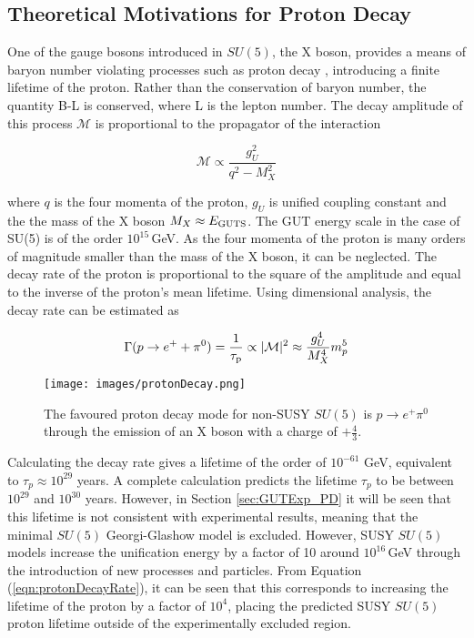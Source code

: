 \documentclass{article}
\begin{document}
\subsection{Theoretical Motivations for Proton Decay}
\label{sec:GUTPDTh}
One of the gauge bosons introduced in $SU(5)$, the X boson, provides a means of baryon number violating processes such as proton decay \cite{SU5ProtonDecay}, introducing a finite lifetime of the proton. Rather than the conservation of baryon number, the quantity B-L is conserved, where L is the lepton number. The decay amplitude of this process $\mathcal{M}$ is proportional to the propagator of the interaction 

\begin{equation}
\label{eqn:protonDecayAmplitude}
    \mathcal{M} \propto \frac{g^2 _U}{q^2 - M^2 _X}
\end{equation}

where $q$ is the four momenta of the proton, $g_U$ is unified coupling constant and the the mass of the X boson $M_X\approx E_{\rm{GUTS}}$. The GUT energy scale in the case of SU(5) is of the order $10^{15}\,$GeV. As the four momenta of the proton is many orders of magnitude smaller than the mass of the X boson, it can be neglected. The decay rate of the proton is proportional to the square of the amplitude and equal to the inverse of the proton's mean lifetime. Using dimensional analysis, the decay rate can be estimated as

\begin{equation}
\label{eqn:protonDecayRate}
    \Gamma(p\rightarrow e^+ + \pi^0)=\frac{1}{\tau_{\rm{p}}}\propto|\mathcal{M}|^2 \approx \frac{g^4 _U}{M^4 _X}m^5 _p
\end{equation}

\begin{figure}
    \centering
    \label{fig:protonDecay}
    \texttt{[image: images/protonDecay.png]}
    \caption{The favoured proton decay mode for non-SUSY $SU(5)$ is $p\rightarrow e^+\pi^0$ through the emission of an X boson with a charge of $+\frac{4}{3}$.}
\end{figure}

Calculating the decay rate gives a lifetime of the order of $10^{-61}$ GeV, equivalent to $\tau_p \approx 10^{29}$ years. A complete calculation predicts the lifetime $\tau_p$ to be between $10^{29}$ and $10^{30}$ years. However, in Section \ref{sec:GUTExp_PD} it will be seen that this lifetime is not consistent with experimental results, meaning that the minimal $SU(5)$ Georgi-Glashow model is excluded. However, SUSY $SU(5)$ models increase the unification energy by a factor of 10 around $10^{16}\,$GeV through the introduction of new processes and particles. From Equation (\ref{eqn:protonDecayRate}), it can be seen that this corresponds to increasing the lifetime of the proton by a factor of $10^4$, placing the predicted SUSY $SU(5)$ proton lifetime outside of the experimentally excluded region.
\end{document}
